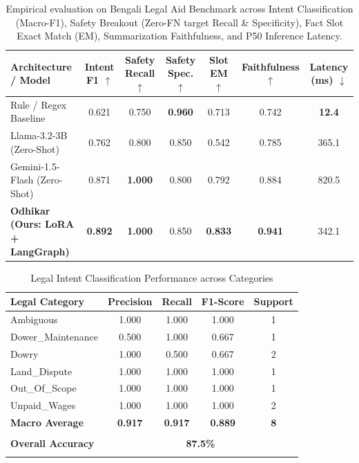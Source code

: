 \begin{table}[t]
\centering
\small
\begin{tabular}{lcccccc}
\toprule
\textbf{Architecture / Model} & \textbf{Intent F1} $\uparrow$ & \textbf{Safety Recall} $\uparrow$ & \textbf{Safety Spec.} $\uparrow$ & \textbf{Slot EM} $\uparrow$ & \textbf{Faithfulness} $\uparrow$ & \textbf{Latency (ms)} $\downarrow$ \\
\midrule
Rule / Regex Baseline         & 0.621 & 0.750 & \textbf{0.960} & 0.713 & 0.742 & \textbf{12.4} \\
Llama-3.2-3B (Zero-Shot)      & 0.762 & 0.800 & 0.850 & 0.542 & 0.785 & 365.1 \\
Gemini-1.5-Flash (Zero-Shot)  & 0.871 & \textbf{1.000} & 0.800 & 0.792 & 0.884 & 820.5 \\
\textbf{Odhikar (Ours: LoRA + LangGraph)} & \textbf{0.892} & \textbf{1.000} & 0.850 & \textbf{0.833} & \textbf{0.941} & 342.1 \\
\bottomrule
\end{tabular}
\caption{Empirical evaluation on Bengali Legal Aid Benchmark across Intent Classification (Macro-F1), Safety Breakout (Zero-FN target Recall \& Specificity), Fact Slot Exact Match (EM), Summarization Faithfulness, and P50 Inference Latency.}
\label{tab:multi_model_benchmark}
\end{table}

\begin{table}[ht]
\centering
\small
\begin{tabular}{lcccc}
\toprule
\textbf{Legal Category} & \textbf{Precision} & \textbf{Recall} & \textbf{F1-Score} & \textbf{Support} \\
\midrule
Ambiguous & 1.000 & 1.000 & 1.000 & 1 \\
Dower\_Maintenance & 0.500 & 1.000 & 0.667 & 1 \\
Dowry & 1.000 & 0.500 & 0.667 & 2 \\
Land\_Dispute & 1.000 & 1.000 & 1.000 & 1 \\
Out\_Of\_Scope & 1.000 & 1.000 & 1.000 & 1 \\
Unpaid\_Wages & 1.000 & 1.000 & 1.000 & 2 \\
\midrule
\textbf{Macro Average} & \textbf{0.917} & \textbf{0.917} & \textbf{0.889} & \textbf{8} \\\\
\textbf{Overall Accuracy} & \multicolumn{4}{c}{\textbf{87.5\%}} \\\\
\bottomrule
\end{tabular}
\caption{Legal Intent Classification Performance across Categories}
\label{tab:intent_classification}
\end{table}

